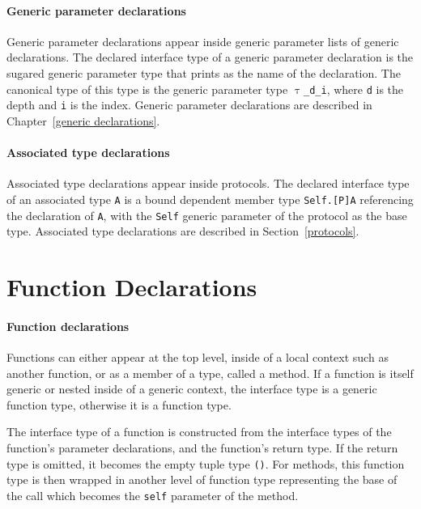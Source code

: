 \documentclass[a4paper,headsepline,bibliography=totoc,toc=flat,fleqn,twoside=semi]{scrbook}
\theoremstyle{definition}
\theoremstyle{definition}
\theoremstyle{definition}
\newcommand{\ttgp}[2]{\texttt{$\uptau$\_#1\_#2}}
\begin{document}
\paragraph{Generic parameter declarations}
Generic parameter declarations appear inside generic parameter lists of generic declarations. The declared interface type of a generic parameter declaration is the sugared generic parameter type that prints as the name of the declaration. The canonical type of this type is the generic parameter type \ttgp{d}{i}, where \texttt{d} is the depth and \texttt{i} is the index. Generic parameter declarations are described in Chapter~\ref{generic declarations}.

\paragraph{Associated type declarations}
Associated type declarations appear inside protocols. The declared interface type of an associated type \texttt{A} is a bound dependent member type \texttt{Self.[P]A} referencing the declaration of \texttt{A}, with the \texttt{Self} generic parameter of the protocol as the base type. Associated type declarations are described in Section~\ref{protocols}.

\section{Function Declarations}\label{func decls}

\paragraph{Function declarations}
Functions can either appear at the top level, inside of a local context such as another function, or as a member of a type, called a method. If a function is itself generic or nested inside of a generic context, the interface type is a generic function type, otherwise it is a function type.

The interface type of a function is constructed from the interface types of the function's parameter declarations, and the function's return type. If the return type is omitted, it becomes the empty tuple type \texttt{()}. For methods, this function type is then wrapped in another level of function type representing the base of the call which becomes the \texttt{self} parameter of the method.
\end{document}
